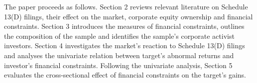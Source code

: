 \documentclass[12pt]{article}
\begin{document}
The paper proceeds as follows. Section 2 reviews relevant literature on Schedule 13(D) filings, their effect on the market, corporate equity ownership and financial constraints. Section 3 introduces the measures of financial constraints, outlines the composition of the sample and identifies the sample's corporate activist investors. Section 4 investigates the market's reaction to Schedule 13(D) filings and analyses the univariate relation between target's abnormal returns and investor's financial constraints. Following the univariate analysis, Section 5 evaluates the cross-sectional effect of financial constraints on the target's gains.


\end{document}
